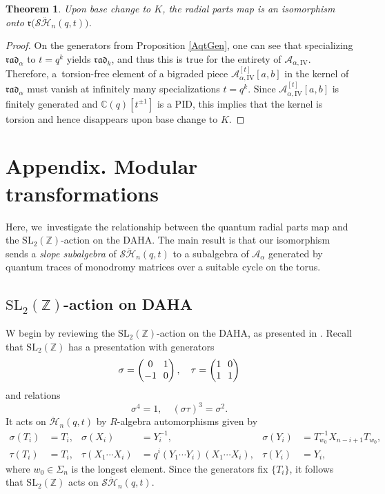 \documentclass[JEP,XML,SOM,Unicode,published]{cedram}
\newcommand{\SL}{\mathrm{SL}}
\newtheorem{thm}{Theorem}[section]
\theoremstyle{definition}
\newcommand{\ZZ}{\mathbb{Z}}
\newcommand{\CC}{\mathbb{C}}
\newcommand{\AAA}{\mathcal{A}}
\newcommand{\SHH}{\mathcal{S}\ddot{\mathcal{H}}}
\newcommand{\HH}{\ddot{\mathcal{H}}}
\newcommand{\rrr}{\mathfrak{r}}
\begin{document}
\begin{thm}
Upon base change to $K$, the radial parts map is an isomorphism onto $\rrr\bigl(\SHH_n(q,t) \bigr)$.
\end{thm}

\begin{proof}
On the generators from Proposition \ref{AqtGen}, one can see that specializing $\mathfrak{rad}_\alpha$ to $t=q^k$ yields $\mathfrak{rad}_k$, and thus this is true for the entirety of $\AAA_{\alpha,\mathrm{IV}}$.
Therefore, a~torsion-free element of a bigraded piece $\AAA^{[t]}_{\alpha,\mathrm{IV}}[a,b]$ in the kernel of $\mathfrak{rad}_\alpha$ must vanish at infinitely many specializations $t=q^k$.
Since $\AAA_{\alpha,\mathrm{IV}}^{[t]}[a,b]$ is finitely generated and $\CC(q)[t^{\pm 1}]$ is a PID, this implies that the kernel is torsion and hence disappears upon base change to $K$.
\end{proof}

\appendix
{}
\section*{Appendix. Modular transformations}

Here, we~investigate the relationship between the quantum radial parts map and the $\SL_2(\ZZ)$-action on the DAHA.
The main result is that our isomorphism sends a \textit{slope subalgebra} of $\SHH_n(q,t)$ to a subalgebra of $\AAA_\alpha$ generated by quantum traces of monodromy matrices over a suitable cycle on the torus.

\subsection{$\SL_2(\ZZ)$-action on DAHA}
W begin by reviewing the $\SL_2(\ZZ)$-action on the DAHA, as presented in \cite[\S3.7]{ChereDAHA}.
Recall that $\SL_2(\ZZ)$ has a presentation with generators
\[\arraycolsep3.5pt
\sigma=
\begin{pmatrix}
0 & 1\\
-1 & 0
\end{pmatrix}
,\quad\tau=
\begin{pmatrix}
1 & 0\\
1 & 1
\end{pmatrix}
\]
and relations
\[
\sigma^4=1,\quad (\sigma\tau)^3=\sigma^2.
\]
It acts on $\HH_n(q,t)$ by $R$-algebra automorphisms given by
\begin{align*}\sigma(T_i)&=T_i, &\sigma(X_i)&=Y_i^{-1}, & \sigma(Y_i)&=T_{w_0}^{-1}X_{n-i+1}T_{w_0},\\
\tau(T_i)&=T_i, & \tau(X_1\cdots X_i)&=q^i(Y_1\cdots Y_i)(X_1\cdots X_i), & \tau(Y_i)&=Y_i,
\end{align*}
where $w_0\in\Sigma_n$ is the longest element.
Since the generators fix $\{T_i\}$, it follows that $\SL_2(\ZZ)$ acts on $\SHH_n(q,t)$.
\end{document}

